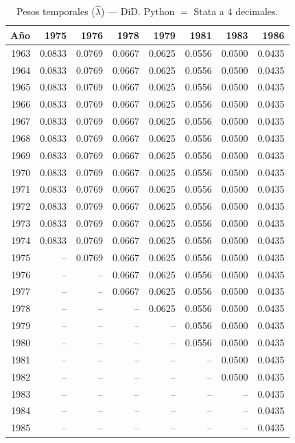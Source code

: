\begin{table}[H]
\centering
\caption{Pesos temporales ($\hat{\lambda}$) --- DiD. Python $=$ Stata a 4 decimales.}
\label{tab:lambda_did}
\small
\begin{tabular}{rrrrrrrr}
\toprule
A\~{n}o & 1975 & 1976 & 1978 & 1979 & 1981 & 1983 & 1986 \\
\midrule
1963 & 0.0833 & 0.0769 & 0.0667 & 0.0625 & 0.0556 & 0.0500 & 0.0435 \\
1964 & 0.0833 & 0.0769 & 0.0667 & 0.0625 & 0.0556 & 0.0500 & 0.0435 \\
1965 & 0.0833 & 0.0769 & 0.0667 & 0.0625 & 0.0556 & 0.0500 & 0.0435 \\
1966 & 0.0833 & 0.0769 & 0.0667 & 0.0625 & 0.0556 & 0.0500 & 0.0435 \\
1967 & 0.0833 & 0.0769 & 0.0667 & 0.0625 & 0.0556 & 0.0500 & 0.0435 \\
1968 & 0.0833 & 0.0769 & 0.0667 & 0.0625 & 0.0556 & 0.0500 & 0.0435 \\
1969 & 0.0833 & 0.0769 & 0.0667 & 0.0625 & 0.0556 & 0.0500 & 0.0435 \\
1970 & 0.0833 & 0.0769 & 0.0667 & 0.0625 & 0.0556 & 0.0500 & 0.0435 \\
1971 & 0.0833 & 0.0769 & 0.0667 & 0.0625 & 0.0556 & 0.0500 & 0.0435 \\
1972 & 0.0833 & 0.0769 & 0.0667 & 0.0625 & 0.0556 & 0.0500 & 0.0435 \\
1973 & 0.0833 & 0.0769 & 0.0667 & 0.0625 & 0.0556 & 0.0500 & 0.0435 \\
1974 & 0.0833 & 0.0769 & 0.0667 & 0.0625 & 0.0556 & 0.0500 & 0.0435 \\
1975 & -- & 0.0769 & 0.0667 & 0.0625 & 0.0556 & 0.0500 & 0.0435 \\
1976 & -- & -- & 0.0667 & 0.0625 & 0.0556 & 0.0500 & 0.0435 \\
1977 & -- & -- & 0.0667 & 0.0625 & 0.0556 & 0.0500 & 0.0435 \\
1978 & -- & -- & -- & 0.0625 & 0.0556 & 0.0500 & 0.0435 \\
1979 & -- & -- & -- & -- & 0.0556 & 0.0500 & 0.0435 \\
1980 & -- & -- & -- & -- & 0.0556 & 0.0500 & 0.0435 \\
1981 & -- & -- & -- & -- & -- & 0.0500 & 0.0435 \\
1982 & -- & -- & -- & -- & -- & 0.0500 & 0.0435 \\
1983 & -- & -- & -- & -- & -- & -- & 0.0435 \\
1984 & -- & -- & -- & -- & -- & -- & 0.0435 \\
1985 & -- & -- & -- & -- & -- & -- & 0.0435 \\
\bottomrule
\end{tabular}
\end{table}